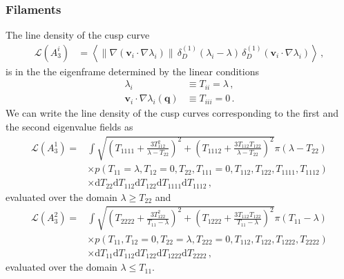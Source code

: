 \documentclass[a4paper, 11pt]{article}
\begin{document}
\subsubsection{Filaments}
The line density of the cusp curve 
\begin{align}
\mathcal{L}(A_3^i) 
&=  \left \langle \| \nabla (\bm{v}_i \cdot \nabla \lambda_i) \|\, \delta_D^{(1)}(\lambda_i-\lambda)\, \delta_D^{(1)}(\bm{v}_i \cdot \nabla \lambda_i) \right \rangle \,,
\end{align}
is in the the eigenframe determined by the linear conditions
\begin{align}
\lambda_{i}&\equiv T_{ii} = \lambda\,,\\
\bm{v}_i \cdot \nabla \lambda_i(\bm{q}) &\equiv T_{iii} = 0\,.
\end{align}
We can write the line density of the cusp curves corresponding to the first and the second eigenvalue fields as
\begin{align}
\mathcal{L}(A_3^1) 
=& \int\sqrt{\left(T_{1111} + \frac{3T_{112}^2}{\lambda-T_{22}}\right)^2 + \left(T_{1112} + \frac{3T_{112}T_{122}}{\lambda-T_{22}}\right)^2} \pi (\lambda-T_{22}) \nonumber\\
&\times p(T_{11}=\lambda,T_{12}=0,T_{22},T_{111}=0,T_{112},T_{122},T_{1111},T_{1112})\nonumber\\
&\times \mathrm{d}T_{22} \mathrm{d}T_{112}\mathrm{d}T_{122}\mathrm{d}T_{1111}\mathrm{d}T_{1112} \,,
\end{align}
evaluated over the domain $\lambda \geq T_{22}$ and
\begin{align}
\mathcal{L}(A_3^2) 
=&  \int\sqrt{\left(T_{2222} + \frac{3T_{122}^2}{T_{11}-\lambda}\right)^2 + \left(T_{1222} + \frac{3T_{112}T_{122}}{T_{11}-\lambda}\right)^2}\pi (T_{11}-\lambda) \nonumber\\
&\times p(T_{11},T_{12}=0,T_{22}=\lambda,T_{222}=0,T_{112},T_{122},T_{1222},T_{2222})\nonumber\\
&\times \mathrm{d}T_{11} \mathrm{d}T_{112}\mathrm{d}T_{122}\mathrm{d}T_{1222}\mathrm{d}T_{2222} \,,
\end{align}
evaluated over the domain $\lambda \leq T_{11}$.
\end{document}
